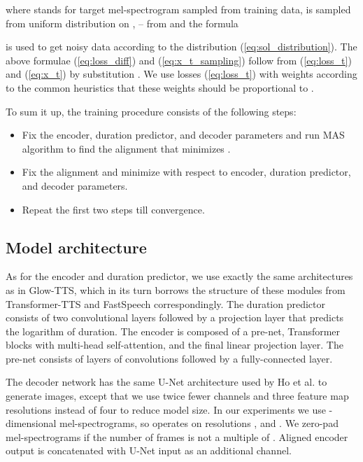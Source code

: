 \documentclass{article}
\begin{document}
where  stands for target mel-spectrogram  sampled from training data,  is sampled from uniform distribution on ,  -- from  and the formula 



is used to get noisy data  according to the distribution (\ref{eq:sol_distribution}). The above formulae (\ref{eq:loss_diff}) and (\ref{eq:x_t_sampling}) follow from (\ref{eq:loss_t}) and (\ref{eq:x_t}) by substitution . We use losses (\ref{eq:loss_t}) with weights  according to the common heuristics that these weights should be proportional to .

To sum it up, the training procedure consists of the following steps:

\begin{itemize}
    \item Fix the encoder, duration predictor, and decoder parameters and run MAS algorithm to find the alignment  that minimizes .
    \item Fix the alignment  and minimize  with respect to encoder, duration predictor, and decoder parameters.
    \item Repeat the first two steps till convergence.
\end{itemize}

\subsection{Model architecture}
\label{subsection:architecture}

As for the encoder and duration predictor, we use exactly the same architectures as in Glow-TTS, which in its turn borrows the structure of these modules from Transformer-TTS \cite{TransformerTTS} and FastSpeech \cite{FastSpeech} correspondingly. The duration predictor consists of two convolutional layers followed by a projection layer that predicts the logarithm of duration. The encoder is composed of a pre-net,  Transformer blocks with multi-head self-attention, and the final linear projection layer. The pre-net consists of  layers of convolutions followed by a fully-connected layer.

The decoder network  has the same U-Net architecture \cite{UNet} used by Ho et al.  to generate  images, except that we use twice fewer channels and three feature map resolutions instead of four to reduce model size. In our experiments we use -dimensional mel-spectrograms, so  operates on resolutions ,  and . We zero-pad mel-spectrograms if the number of frames  is not a multiple of . Aligned encoder output  is concatenated with U-Net input  as an additional channel.
\end{document}
